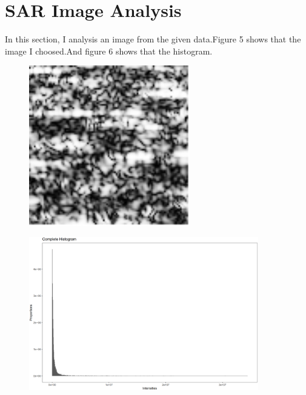 \documentclass[UTF8,a4paper,10pt]{ctexart}
\begin{document}
\section{SAR Image Analysis}
In this section, I analysis an image from the given data.Figure 5 shows that the image I choosed.And figure 6 shows that the histogram.

\begin{figure}[htb] \center
	\includegraphics[width=7cm]  {a.png}
	\caption{ } 
\end{figure}
\begin{figure}[htb] \center
	\includegraphics[width=10cm]  {b.png}
	\caption{ } 
\end{figure}
\end{document}
